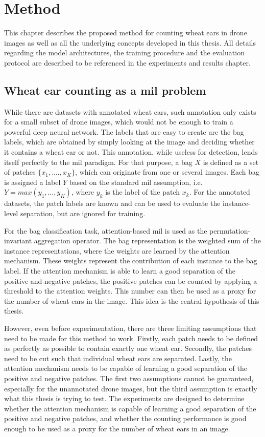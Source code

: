 \documentclass[12pt,parskip = half, DIV=classic,listof=totoc]{scrartcl}
\begin{document}
	\section{Method}
		This chapter describes the proposed method for counting wheat ears in drone images as well as all the underlying concepts developed in this thesis. 
		All details regarding the model architectures, the training procedure and the evaluation protocol are described to be referenced in the
		experiments and results chapter.
		\subsection{Wheat ear counting as a \acs*{mil} problem}\label{sec:method_wheat_mil}

			While there are datasets with annotated wheat ears, such annotation only exists for a small subset of drone images, which would not 
			be enough to train a powerful deep neural network. The labels that are easy to create are the bag labels, which are obtained by 
			simply looking at the image and deciding whether it contains a wheat ear or not. This annotation, while useless for detection, lends itself 
			perfectly to the \ac{mil} paradigm. For that purpose, a bag $X$ is defined as a set of patches $\{x_1,.\dots,x_K\}$, which can originate from 
			one or several images. Each bag is assigned a label $Y$ based on the standard \ac{mil} assumption, i.e. $Y = max(y_1,\dots,y_K)$, where 
			$y_k$ is the label of the patch $x_k$. For the annotated datasets, the patch labels are known and can be used to evaluate the 
			instance-level separation, but are ignored for training. 

			For the bag classification task, attention-based \ac{mil} is used as the permutation-invariant aggregation operator. The bag representation is the 
			weighted sum of the instance representations, where the weights are learned by the attention mechanism. These weights represent
			the contribution of each instance to the bag label. If the attention mechanism is able to learn a good separation of the positive
			and negative patches, the positive patches can be counted by applying a threshold to the attention weights. This number can then
			be used as a proxy for the number of wheat ears in the image. This idea is the central hypothesis of this thesis.

			However, even before experimentation, there are three limiting assumptions that need to be made for this method to work. Firstly, 
			each patch needs to be defined as perfectly as possible to contain exactly one wheat ear. Secondly, the patches need to be cut such that individual wheat ears are separated.
			Lastly, the attention mechanism needs to be capable of learning a good separation of the positive and negative patches.
			The first two assumptions cannot be guaranteed, especially for the unannotated drone images, but the third assumption is exactly 
			what this thesis is trying to test. The experiments are designed to determine whether the attention mechanism is capable of learning a good separation 
			of the positive and negative patches, and whether the counting performance is good enough to be used as a proxy for the number of wheat ears in an image.
\end{document}
